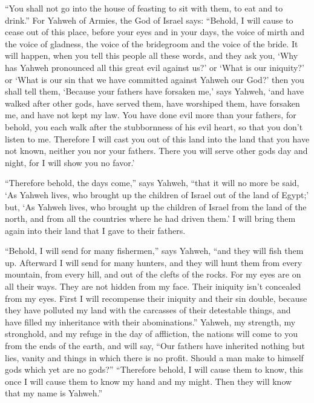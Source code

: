  ``You shall not go into the house of feasting to sit with
them, to eat and to drink.''  For Yahweh of Armies, the
God of Israel says: ``Behold, I will cause to cease out of this place,
before your eyes and in your days, the voice of mirth and the voice of
gladness, the voice of the bridegroom and the voice of the bride.
 It will happen, when you tell this people all these
words, and they ask you, `Why has Yahweh pronounced all this great evil
against us?' or `What is our iniquity?' or `What is our sin that we have
committed against Yahweh our God?'  then you shall tell
them, `Because your fathers have forsaken me,' says Yahweh, `and have
walked after other gods, have served them, have worshiped them, have
forsaken me, and have not kept my law.  You have done
evil more than your fathers, for behold, you each walk after the
stubbornness of his evil heart, so that you don't listen to me.
 Therefore I will cast you out of this land into the land
that you have not known, neither you nor your fathers. There you will
serve other gods day and night, for I will show you no favor.'

 ``Therefore behold, the days come,'' says Yahweh, ``that
it will no more be said, `As Yahweh lives, who brought up the children
of Israel out of the land of Egypt;'  but, `As Yahweh
lives, who brought up the children of Israel from the land of the north,
and from all the countries where he had driven them.' I will bring them
again into their land that I gave to their fathers.

 ``Behold, I will send for many fishermen,'' says Yahweh,
``and they will fish them up. Afterward I will send for many hunters,
and they will hunt them from every mountain, from every hill, and out of
the clefts of the rocks.  For my eyes are on all their
ways. They are not hidden from my face. Their iniquity isn't concealed
from my eyes.  First I will recompense their iniquity and
their sin double, because they have polluted my land with the carcasses
of their detestable things, and have filled my inheritance with their
abominations.''  Yahweh, my strength, my stronghold, and
my refuge in the day of affliction, the nations will come to you from
the ends of the earth, and will say, ``Our fathers have inherited
nothing but lies, vanity and things in which there is no profit.
 Should a man make to himself gods which yet are no
gods?''  ``Therefore behold, I will cause them to know,
this once I will cause them to know my hand and my might. Then they will
know that my name is Yahweh.''

